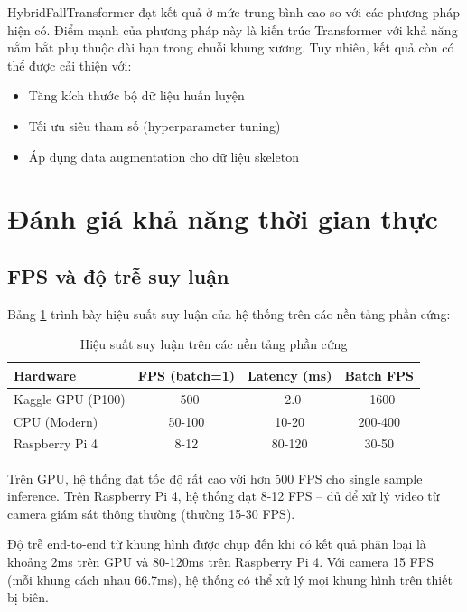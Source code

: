 HybridFallTransformer đạt kết quả ở mức trung bình-cao so với các phương pháp hiện có. Điểm mạnh của phương pháp này là kiến trúc Transformer với khả năng nắm bắt phụ thuộc dài hạn trong chuỗi khung xương. Tuy nhiên, kết quả còn có thể được cải thiện với:

\begin{itemize}
    \item Tăng kích thước bộ dữ liệu huấn luyện
    \item Tối ưu siêu tham số (hyperparameter tuning)
    \item Áp dụng data augmentation cho dữ liệu skeleton
\end{itemize}


\section{Đánh giá khả năng thời gian thực}
\label{sec:realtime_evaluation}

\subsection{FPS và độ trễ suy luận}
\label{sec:fps_latency}

Bảng \ref{tab:fps_latency} trình bày hiệu suất suy luận của hệ thống trên các nền tảng phần cứng:

\begin{table}[h]
\centering
\caption{Hiệu suất suy luận trên các nền tảng phần cứng}
\label{tab:fps_latency}
\begin{tabular}{|l|c|c|c|}
\hline
\textbf{Hardware} & \textbf{FPS (batch=1)} & \textbf{Latency (ms)} & \textbf{Batch FPS} \\
\hline
Kaggle GPU (P100) & ~500 & ~2.0 & ~1600 \\
\hline
CPU (Modern) & 50-100 & 10-20 & 200-400 \\
\hline
Raspberry Pi 4 & 8-12 & 80-120 & 30-50 \\
\hline
\end{tabular}
\end{table}

Trên GPU, hệ thống đạt tốc độ rất cao với hơn 500 FPS cho single sample inference. Trên Raspberry Pi 4, hệ thống đạt 8-12 FPS -- đủ để xử lý video từ camera giám sát thông thường (thường 15-30 FPS).

Độ trễ end-to-end từ khung hình được chụp đến khi có kết quả phân loại là khoảng 2ms trên GPU và 80-120ms trên Raspberry Pi 4. Với camera 15 FPS (mỗi khung cách nhau 66.7ms), hệ thống có thể xử lý mọi khung hình trên thiết bị biên.

